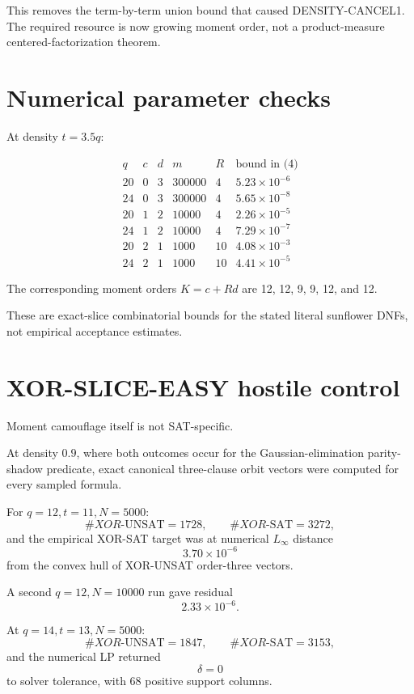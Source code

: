\documentclass[11pt]{article}
\begin{document}
This removes the term-by-term union bound that caused DENSITY-CANCEL1.
The required resource is now growing moment order, not a product-measure
centered-factorization theorem.

\section{Numerical parameter checks}

At density \(t=3.5q\):

\[
\begin{array}{c|c|c|c|c|c}
q&c&d&m&R&\text{bound in (4)}\\
\hline
20&0&3&300000&4&5.23\times10^{-6}\\
24&0&3&300000&4&5.65\times10^{-8}\\
20&1&2&10000&4&2.26\times10^{-5}\\
24&1&2&10000&4&7.29\times10^{-7}\\
20&2&1&1000&10&4.08\times10^{-3}\\
24&2&1&1000&10&4.41\times10^{-5}
\end{array}
\]

The corresponding moment orders \(K=c+Rd\) are 12, 12, 9, 9, 12, and 12.

These are exact-slice combinatorial bounds for the stated literal sunflower
DNFs, not empirical acceptance estimates.

\section{XOR-SLICE-EASY hostile control}

Moment camouflage itself is not SAT-specific.

At density \(0.9\), where both outcomes occur for the Gaussian-elimination
parity-shadow predicate, exact canonical three-clause orbit vectors were
computed for every sampled formula.

For \(q=12,t=11,N=5000\):
\[
\#XOR\text{-UNSAT}=1728,
\qquad
\#XOR\text{-SAT}=3272,
\]
and the empirical XOR-SAT target was at numerical \(L_\infty\) distance
\[
3.70\times10^{-6}
\]
from the convex hull of XOR-UNSAT order-three vectors.

A second \(q=12,N=10000\) run gave residual
\[
2.33\times10^{-6}.
\]

At \(q=14,t=13,N=5000\):
\[
\#XOR\text{-UNSAT}=1847,
\qquad
\#XOR\text{-SAT}=3153,
\]
and the numerical LP returned
\[
\boxed{\delta=0}
\]
to solver tolerance, with 68 positive support columns.
\end{document}
